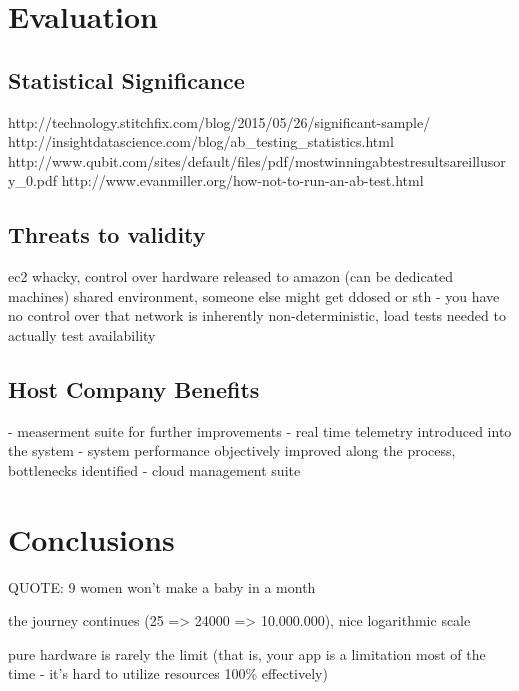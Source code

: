 \documentclass{uvamscse}
\begin{document}

\chapter{Evaluation}\label{Evaluation}

\section{Statistical Significance}
http://technology.stitchfix.com/blog/2015/05/26/significant-sample/
http://insightdatascience.com/blog/ab\_testing\_statistics.html
http://www.qubit.com/sites/default/files/pdf/mostwinningabtestresultsareillusory\_0.pdf
http://www.evanmiller.org/how-not-to-run-an-ab-test.html


\section{Threats to validity}
ec2 whacky, control over hardware released to amazon (can be dedicated machines)
shared environment, someone else might get ddosed or sth - you have no control over that
network is inherently non-deterministic, load tests needed to actually test availability

\section{Host Company Benefits}
- measerment suite for further improvements
- real time telemetry introduced into the system
- system performance objectively improved along the process, bottlenecks identified
- cloud management suite

\chapter{Conclusions}\label{Conclusions}
QUOTE: 9 women won't make a baby in a month

the journey continues (25 => 24000 => 10.000.000), nice logarithmic scale

pure hardware is rarely the limit (that is, your app is a limitation most of the time - it's hard to utilize resources 100\% effectively)
\end{document}
